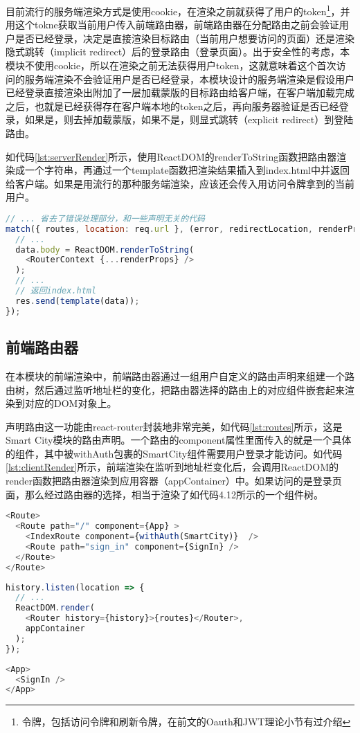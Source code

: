 目前流行的服务端渲染方式是使用cookie，在渲染之前就获得了用户的token\footnote{令牌，包括访问令牌和刷新令牌，在前文的Oauth和JWT理论小节有过介绍}，并用这个tokne获取当前用户传入前端路由器，前端路由器在分配路由之前会验证用户是否已经登录，决定是直接渲染目标路由（当前用户想要访问的页面）还是渲染隐式跳转（implicit redirect）后的登录路由（登录页面）。出于安全性的考虑，本模块不使用cookie，所以在渲染之前无法获得用户token，这就意味着这个首次访问的服务端渲染不会验证用户是否已经登录，本模块设计的服务端渲染是假设用户已经登录直接渲染出附加了一层加载蒙版的目标路由给客户端，在客户端加载完成之后，也就是已经获得存在客户端本地的token之后，再向服务器验证是否已经登录，如果是，则去掉加载蒙版，如果不是，则显式跳转（explicit redirect）到登陆路由。

如代码\ref{lst:serverRender}所示，使用ReactDOM的renderToString函数把路由器渲染成一个字符串，再通过一个template函数把渲染结果插入到index.html中并返回给客户端。如果是用流行的那种服务端渲染，应该还会传入用访问令牌拿到的当前用户。
\begin{lstlisting}[language={JavaScript}, label={lst:serverRender}, caption={服务端渲染样例代码}]
// ... 省去了错误处理部分，和一些声明无关的代码
match({ routes, location: req.url }, (error, redirectLocation, renderProps) => {
  // ...
  data.body = ReactDOM.renderToString(
    <RouterContext {...renderProps} />
  );
  // ...
  // 返回index.html
  res.send(template(data));
});
\end{lstlisting}

\subsection{前端路由器}
在本模块的前端渲染中，前端路由器通过一组用户自定义的路由声明来组建一个路由树，然后通过监听地址栏的变化，把路由器选择的路由上的对应组件嵌套起来渲染到对应的DOM对象上。

声明路由这一功能由react-router封装地非常完美，如代码\ref{lst:routes}所示，这是Smart City模块的路由声明。一个路由的component属性里面传入的就是一个具体的组件，其中被withAuth包裹的SmartCity组件需要用户登录才能访问。如代码\ref{lst:clientRender}所示，前端渲染在监听到地址栏变化后，会调用ReactDOM的render函数把路由器渲染到应用容器（appContainer）中。如果访问的是登录页面，那么经过路由器的选择，相当于渲染了如代码4.12所示的一个组件树。
\begin{lstlisting}[language={JavaScript}, label={lst:routes}, caption={Smart City路由声明}]
<Route>
  <Route path="/" component={App} >
    <IndexRoute component={withAuth(SmartCity)}  />
    <Route path="sign_in" component={SignIn} />
  </Route>
</Route>
\end{lstlisting}
\begin{lstlisting}[language={JavaScript}, label={lst:clientRender}, caption={Smart City前端渲染}]
history.listen(location => {
  // ...
  ReactDOM.render(
    <Router history={history}>{routes}</Router>,
    appContainer
  );
});
\end{lstlisting}
\begin{lstlisting}[language={JavaScript}, caption={Smart City登录页面实际渲染的组件树}]
<App>
  <SignIn />
</App>
\end{lstlisting}

